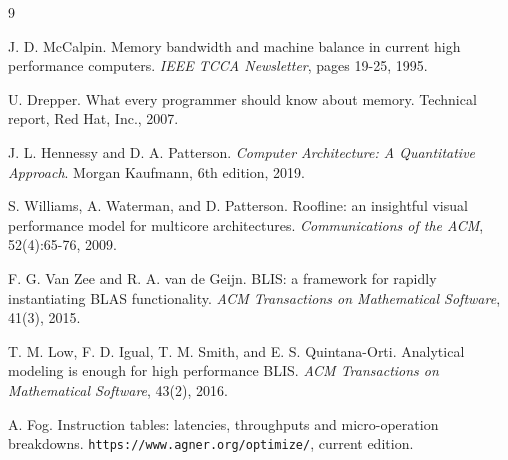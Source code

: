 \documentclass[11pt,a4paper]{report}
\begin{document}
\begin{thebibliography}{9}

J. D. McCalpin. Memory bandwidth and machine balance in current high
performance computers. \textit{IEEE TCCA Newsletter}, pages 19-25, 1995.

U. Drepper. What every programmer should know about memory. Technical report,
Red Hat, Inc., 2007.

J. L. Hennessy and D. A. Patterson. \textit{Computer Architecture: A
Quantitative Approach}. Morgan Kaufmann, 6th edition, 2019.

S. Williams, A. Waterman, and D. Patterson. Roofline: an insightful visual
performance model for multicore architectures. \textit{Communications of the
ACM}, 52(4):65-76, 2009.

F. G. Van Zee and R. A. van de Geijn. BLIS: a framework for rapidly
instantiating BLAS functionality. \textit{ACM Transactions on Mathematical
Software}, 41(3), 2015.

T. M. Low, F. D. Igual, T. M. Smith, and E. S. Quintana-Orti. Analytical
modeling is enough for high performance BLIS. \textit{ACM Transactions on
Mathematical Software}, 43(2), 2016.

A. Fog. Instruction tables: latencies, throughputs and micro-operation
breakdowns. \texttt{https://www.agner.org/optimize/}, current edition.

\end{thebibliography}
\end{document}
